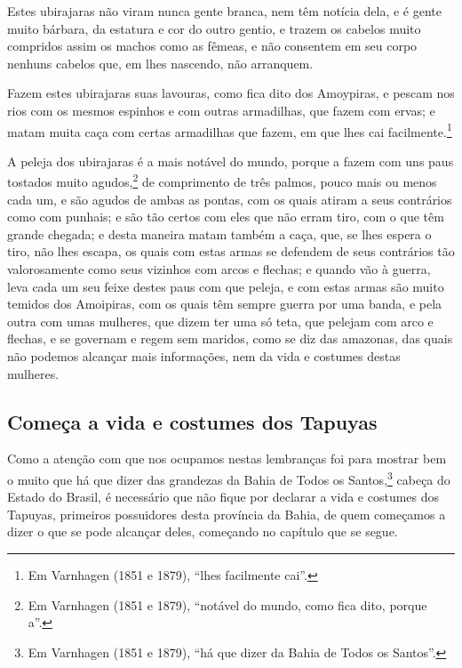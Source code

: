 \begin{linenumbers}
Estes ubirajaras não viram nunca gente branca, nem têm notícia dela, e é gente muito
bárbara, da estatura e cor do outro gentio, e trazem os cabelos muito compridos assim os
machos como as fêmeas, e não consentem em seu corpo nenhuns cabelos que, em lhes nascendo,
não arranquem.

Fazem estes ubirajaras suas lavouras, como fica dito dos Amoypiras, e pescam nos rios com
os mesmos espinhos e com outras armadilhas, que fazem com ervas; e matam muita caça com
certas armadilhas que fazem, em que lhes cai facilmente.\footnote{ Em Varnhagen (1851 e
1879), ``lhes facilmente cai''.}

A peleja dos ubirajaras é a mais notável do mundo, porque a fazem com uns paus tostados
muito agudos,\footnote{ Em Varnhagen (1851 e 1879), ``notável do mundo, como fica dito,
porque a''.} de comprimento de três palmos, pouco mais ou menos cada um, e são agudos de
ambas as pontas, com os quais atiram a seus contrários como com punhais; e são tão certos
com eles que não erram tiro, com o que têm grande chegada; e desta maneira matam também a
caça, que, se lhes espera o tiro, não lhes escapa, os quais com estas armas se defendem de
seus contrários tão valorosamente como seus vizinhos com arcos e flechas; e quando vão à
guerra, leva cada um seu feixe destes paus com que peleja, e com estas armas são muito
temidos dos Amoipiras, com os quais têm sempre guerra por uma banda, e pela outra com umas
mulheres, que dizem ter uma só teta, que pelejam com arco e flechas, e se governam e regem
sem maridos, como se diz das amazonas, das quais não podemos alcançar mais informações,
nem da vida e costumes destas mulheres.

\subsection{Começa a vida e costumes dos Tapuyas}

Como a atenção com que nos ocupamos nestas lembranças foi para mostrar bem o muito que há
que dizer das grandezas da Bahia de Todos os Santos,\footnote{ Em Varnhagen (1851 e 1879),
``há que dizer da Bahia de Todos os Santos''.} cabeça do Estado do Brasil, é necessário
que não fique por declarar a vida e costumes dos Tapuyas, primeiros possuidores desta
província da Bahia, de quem começamos a dizer o que se pode alcançar deles, começando no
capítulo que se segue.


\end{linenumbers}
